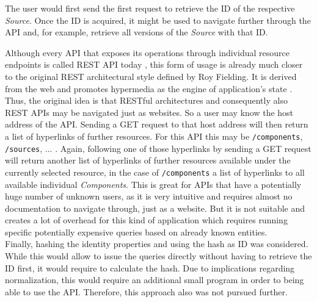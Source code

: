 The user would first send the first request to retrieve the ID of the respective \emph{Source}. Once the ID is acquired, it might be used to navigate further through the API and, for example, retrieve all versions of the \emph{Source} with that ID.\par
Although every API that exposes its operations through individual resource endpoints is called REST API today \cite{RichardsonMaturityModel}, this form of usage is already much closer to the original REST architectural style defined by Roy Fielding. It is derived from the web and promotes hypermedia as the engine of application's state \cite{RESTArchitecturalStyle}. Thus, the original idea is that RESTful architectures and consequently also REST APIs may be navigated just as websites. So a user may know the host address of the API. Sending a GET request to that host address will then return a list of hyperlinks of further resources. For this API this may be \lstinline|/components|, \lstinline|/sources|, ... . Again, following one of those hyperlinks by sending a GET request will return another list of hyperlinks of further resources available under the currently selected resource, in the case of \lstinline|/components| a list of hyperlinks to all available individual \emph{Components}. This is great for APIs that have a potentially huge number of unknown users, as it is very intuitive and requires almost no documentation to navigate through, just as a website. But it is not suitable and creates a lot of overhead for this kind of application which requires running specific potentially expensive queries based on already known entities.\\

Finally, hashing the identity properties and using the hash as ID was considered. While this would allow to issue the queries directly without having to retrieve the ID first, it would require to calculate the hash. Due to implications regarding normalization, this would require an additional small program in order to being able to use the API. Therefore, this approach also was not pursued further.

